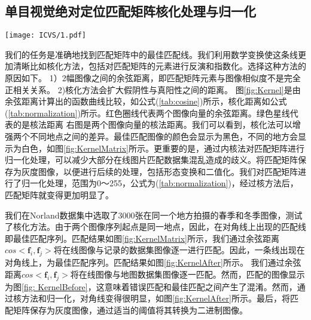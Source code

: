 \subsection{单目视觉绝对定位匹配矩阵核化处理与归一化}
\begin{figure*}[t]
  \centering
  \texttt{[image: ICVS/1.pdf]}
  \caption{矩阵核化运算前后函数曲线对比。}
  \label{fig:Kernel}
\end{figure*}

我们的任务是准确地找到匹配矩阵中的最佳匹配线。我们利用数学变换使这条线更加清晰比如核化方法，包括对匹配矩阵的元素进行反演和指数化。选择这种方法的原因如下。
1）2幅图像之间的余弦距离，即匹配矩阵元素与图像相似度不是完全正相关关系。
2)核化方法会扩大假阴性与真阳性之间的距离。
图\ref{fig:Kernel}是由余弦距离计算出的函数曲线比较，如公式(\ref{tab:cosine})所示，核化距离如公式(\ref{tab:normalization})所示。红色圈线代表两个图像向量的余弦距离。绿色星线代表的是核法距离 右图是两个图像向量的核法距离。我们可以看到，核化法可以增强两个不同地点之间的差异。最佳匹配图像的颜色会显示为黑色，不同的地方会显示为白色，如图\ref{fig:KernelMatrix}所示。更重要的是，通过内核法对匹配矩阵进行归一化处理，可以减少大部分在线图片匹配数据集混乱造成的歧义。将匹配矩阵保存为灰度图像，以便进行后续的处理，包括形态变换和二值化。我们对匹配矩阵进行了归一化处理，范围为0～255，公式为(\ref{tab:normalization})，经过核方法后，匹配矩阵就变得更加明显了。


我们在Norland数据集中选取了3000张在同一个地方拍摄的春季和冬季图像，测试了核化方法。由于两个图像序列起点是同一地点，因此，在对角线上出现的匹配线即最佳匹配序列。匹配结果如图\ref{fig:KernelMatrix}所示，我们通过余弦距离$cos <\mathbf f_i,\mathbf f_j>$将在线图像与记录的数据集图像逐一进行匹配。因此，一条线出现在对角线上，为最佳匹配序列。匹配结果如图\ref{fig:KernelAfter}所示。
我们通过余弦距离$cos <\mathbf f_i,\mathbf f_j>$将在线图像与地图数据集图像逐一匹配。然而，匹配的图像显示为图\ref{fig: KernelBefore}，这意味着错误匹配和最佳匹配之间产生了混淆。然而，通过核方法和归一化，对角线变得很明显，如图\ref{fig:KernelAfter}所示。最后，将匹配矩阵保存为灰度图像，通过适当的阈值将其转换为二进制图像。

